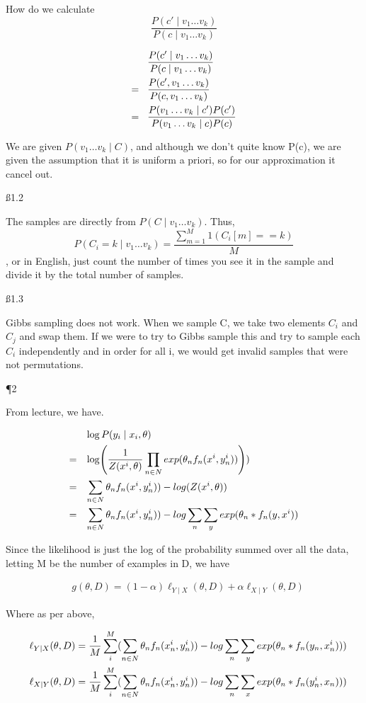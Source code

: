 How do we calculate \[
\frac{P(c' \mid v_1 \dots v_k)}{P(c \mid v_1 \dots v_k)}
\]

\begin{align*}
& \frac{P(c' \mid v_1 \dots v_k)}{P(c \mid v_1 \dots v_k)} \nl
\frac{P(c', v_1 \dots v_k)}{P(c, v_1 \dots v_k)} \nl
\frac{P(v_1 \dots v_k \mid c') P(c')}{P(v_1 \dots v_k \mid c) P(c)}
\end{align*}

We are given $P(v_1 \dots v_k \mid C)$, and although we don't quite know P(c), we are given the assumption that it is uniform a priori, so for our approximation it cancel out.

\ss {1.2}

The samples are directly from $P(C \mid v_1 \dots v_k)$. Thus,
\[P(C_i = k \mid v_1 \dots v_k) = \frac{\sum_{m=1}^M 1(C_i[m]==k)}{M}
\], or in English, just count the number of times you see it in the sample and divide it by the total number of samples.

\ss {1.3}

Gibbs sampling does not work. When we sample C, we take two elements $C_i$ and $C_j$ and swap them. If we were to try to Gibbs sample this and try to sample each $C_i$ independently and in order for all i, we would get invalid samples that were not permutations.

\P 2

From lecture, we have.

\begin{align*}
& \log P(y_i \mid x_i, \theta) \nl \log(\frac{1}{Z(x^i, \theta)} \prod_{n \in N} exp(\theta_n f_n(x^i,y_n^i)))) \nl
\sum_{n \in N} \theta_n f_n(x^i,y_n^i)) - log(Z(x^i, \theta)) \nl
\sum_{n \in N} \theta_n f_n(x^i,y_n^i)) - log \sum_n \sum_y exp(\theta_n * f_n(y,x^i))
\end{align*}

Since the likelihood is just the log of the probability summed over all the data, letting M be the number of examples in D, we have

\begin{align*}
& g(\theta, D) = (1-\alpha)\ell_{Y \mid X}(\theta, D) + \alpha\ell_{X \mid Y}(\theta,D)
\end{align*}

Where as per above,

\begin{align*}
&\ell_{Y \mid X}(\theta, D) = \frac{1}{M}\sum_i^M (\sum_{n \in N} \theta_n f_n(x_n^i,y_n^i)) - log \sum_n \sum_y exp(\theta_n * f_n(y_n,x_n^i))) \\ \sp &
\ell_{X \mid Y}(\theta, D) = \frac{1}{M}\sum_i^M (\sum_{n \in N} \theta_n f_n(x_n^i,y_n^i)) - log \sum_n \sum_x exp(\theta_n * f_n(y_n^i,x_n)))
\end{align*}

